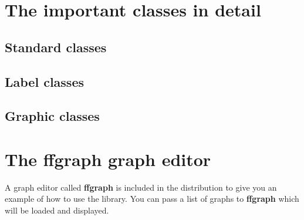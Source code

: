 \documentclass[a4paper]{article}
\begin{document}


\section{The important classes in detail} 
\label{classes_in_detail}

\subsection{Standard classes}
\label{standard_classes}



\subsection{Label classes}
\label{label_classes}



\subsection{Graphic classes}
\label{graphic_classes}



\section{The ffgraph graph editor} 

A graph editor called {\bf ffgraph} is included in the
distribution to give you an example of how to use the library.
You can pass a list of graphs to {\bf ffgraph} which will be
loaded and displayed.
\end{document}
